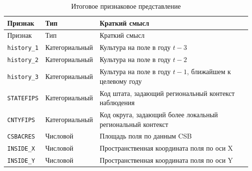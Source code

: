 \begin{center}
\small
\begin{longtable}{p{} p{} p{}}
\caption{Итоговое признаковое представление}
\label{tab:final-model-features}\\
\toprule
Признак & Тип & Краткий смысл \\
\midrule
\endfirsthead

\toprule
Признак & Тип & Краткий смысл \\
\midrule
\endhead

\bottomrule
\endlastfoot

\texttt{history\_1} &
Категориальный &
Культура на поле в году \(t-3\) \\

\texttt{history\_2} &
Категориальный &
Культура на поле в году \(t-2\) \\

\texttt{history\_3} &
Категориальный &
Культура на поле в году \(t-1\), ближайшем к целевому году \\

\texttt{STATEFIPS} &
Категориальный &
Код штата, задающий региональный контекст наблюдения \\

\texttt{CNTYFIPS} &
Категориальный &
Код округа, задающий более локальный региональный контекст \\

\texttt{CSBACRES} &
Числовой &
Площадь поля по данным CSB \\

\texttt{INSIDE\_X} &
Числовой &
Пространственная координата поля по оси X \\

\texttt{INSIDE\_Y} &
Числовой &
Пространственная координата поля по оси Y \\

\end{longtable}
\end{center}
